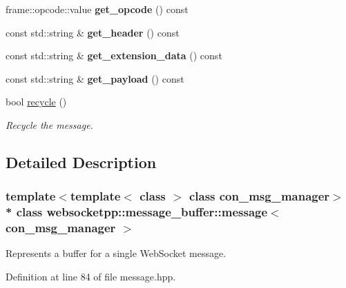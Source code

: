 \begin{DoxyCompactItemize}
\item 
frame\+::opcode\+::value {\bfseries get\+\_\+opcode} () const\hypertarget{classwebsocketpp_1_1message__buffer_1_1message_aa8f82b2e145e1d52ce4a537c3df40389}{}\label{classwebsocketpp_1_1message__buffer_1_1message_aa8f82b2e145e1d52ce4a537c3df40389}

\item 
const std\+::string \& {\bfseries get\+\_\+header} () const\hypertarget{classwebsocketpp_1_1message__buffer_1_1message_a8e8f956bbfd499870da784d36bb117a9}{}\label{classwebsocketpp_1_1message__buffer_1_1message_a8e8f956bbfd499870da784d36bb117a9}

\item 
const std\+::string \& {\bfseries get\+\_\+extension\+\_\+data} () const\hypertarget{classwebsocketpp_1_1message__buffer_1_1message_a12a37641158f68e0564109153355adb1}{}\label{classwebsocketpp_1_1message__buffer_1_1message_a12a37641158f68e0564109153355adb1}

\item 
const std\+::string \& {\bfseries get\+\_\+payload} () const\hypertarget{classwebsocketpp_1_1message__buffer_1_1message_ac70e1d58b84c86adabfb5ed4b27bae6e}{}\label{classwebsocketpp_1_1message__buffer_1_1message_ac70e1d58b84c86adabfb5ed4b27bae6e}

\item 
bool \hyperlink{classwebsocketpp_1_1message__buffer_1_1message_a2c19e247389598d9f81c9447ddcfba51}{recycle} ()
\begin{DoxyCompactList}\small\item\em Recycle the message. \end{DoxyCompactList}\end{DoxyCompactItemize}


\subsection{Detailed Description}
\subsubsection*{template$<$template$<$ class $>$ class con\+\_\+msg\+\_\+manager$>$\\*
class websocketpp\+::message\+\_\+buffer\+::message$<$ con\+\_\+msg\+\_\+manager $>$}

Represents a buffer for a single Web\+Socket message. 

Definition at line 84 of file message.\+hpp.



